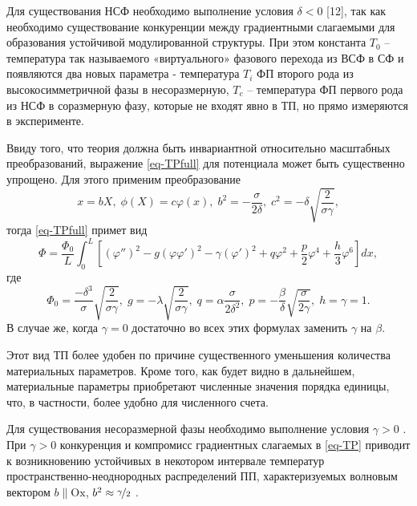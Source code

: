 Для существования НСФ необходимо выполнение условия $\delta < 0$ \cite{Ishibashi1978}[12], так как необходимо существование конкуренции между градиентными слагаемыми для образования устойчивой модулированной структуры.
При этом константа $T_0$ -- температура так называемого «виртуального» фазового перехода из ВСФ в СФ и появляются два новых параметра - температура $T_i$ ФП второго рода из высокосимметричной фазы в несоразмерную, $T_c$ -- температура ФП первого рода из НСФ в соразмерную фазу, которые не входят явно в ТП, но прямо измеряются в эксперименте.

Ввиду того, что теория должна быть инвариантной относительно масштабных преобразований, выражение \eqref{eq-TPfull} для потенциала может быть существенно упрощено.
Для этого применим преобразование
\begin{equation}
x = bX, \; \phi(X) = c\varphi(x), \; b^2 = -\frac{\sigma}{2\delta}, \; c^2 = -\delta\sqrt{\frac{2}{\sigma\gamma}},
\label{eq-subst}
\end{equation}
тогда \eqref{eq-TPfull} примет вид
\begin{equation}
\Phi = \frac{\Phi_0}{L} \int_0^L \left[
            \left(\varphi''\right)^2 - g\left(\varphi\varphi'\right)^2 -
            \gamma\left(\varphi'\right)^2 +
            q\varphi^2 + \frac{p}{2}\varphi^4 + \frac{h}{3}\varphi^6
            \right] dx,
\label{eq-TP}
\end{equation}
где
\begin{equation}
\Phi_0 = \frac{-\delta^3}{\sigma}\sqrt{\frac{2}{\sigma\gamma}},\;
g = -\lambda\sqrt{\frac{2}{\sigma\gamma}},\;
q = \alpha\frac{\sigma}{2\delta^2},\;
p = -\frac{\beta}{\delta}\sqrt{\frac{\sigma}{2\gamma}},\;
h = \gamma = 1.
\label{eq-TPparts}
\end{equation}
В случае же, когда $\gamma=0$ достаточно во всех этих формулах заменить $\gamma$ на $\beta$.

Этот вид ТП более удобен по причине существенного уменьшения количества материальных параметров.
Кроме того, как будет видно в дальнейшем, материальные параметры приобретают численные значения порядка единицы, что, в частности, более удобно для численного счета.

Для существования несоразмерной фазы необходимо выполнение условия $\gamma>0$ \cite{Ishibashi1978}.
При $\gamma>0$ конкуренция и компромисс градиентных слагаемых в \eqref{eq-TP} приводит к возникновению устойчивых в некотором интервале температур пространственно-неоднородных распределений ПП, характеризуемых волновым вектором $b \| \mathrm{Ox}$, $b^2 \approx \nicefrac{\gamma}{2}$ \cite{Ishibashi1978}.

